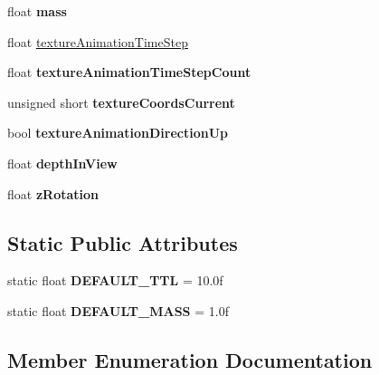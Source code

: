 \begin{DoxyCompactItemize}
float {\bfseries mass}
\item 
float \hyperlink{structPUParticle3D_a63797f819d67dd9e470e74f9de595e3e}{texture\+Animation\+Time\+Step}
\item 
\mbox{\label{structPUParticle3D_a373cc95a4edea581f75da5cd022150af}} 
float {\bfseries texture\+Animation\+Time\+Step\+Count}
\item 
\mbox{\label{structPUParticle3D_a4548b60b1c896cecbeab3dc26e905f34}} 
unsigned short {\bfseries texture\+Coords\+Current}
\item 
\mbox{\label{structPUParticle3D_a78498e30401857ae11bd06753f83ef66}} 
bool {\bfseries texture\+Animation\+Direction\+Up}
\item 
\mbox{\label{structPUParticle3D_a52bfb617ec0b7896fdbb81757fa9861d}} 
float {\bfseries depth\+In\+View}
\item 
\mbox{\label{structPUParticle3D_a12887b50734c367aa8bf90061a0220f0}} 
float {\bfseries z\+Rotation}
\end{DoxyCompactItemize}
\subsection*{Static Public Attributes}
\begin{DoxyCompactItemize}
\item 
\mbox{\label{structPUParticle3D_a51625cb2f5f76ae6c4f7c9aba2cbddbd}} 
static float {\bfseries D\+E\+F\+A\+U\+L\+T\+\_\+\+T\+TL} = 10.\+0f
\item 
\mbox{\label{structPUParticle3D_a55db6908ac307df4db61e71040a7bd17}} 
static float {\bfseries D\+E\+F\+A\+U\+L\+T\+\_\+\+M\+A\+SS} = 1.\+0f
\end{DoxyCompactItemize}


\subsection{Member Enumeration Documentation}
\mbox{\label{structPUParticle3D_a2889eb4db1dc86b0bd60c411c7f8c657}} 
